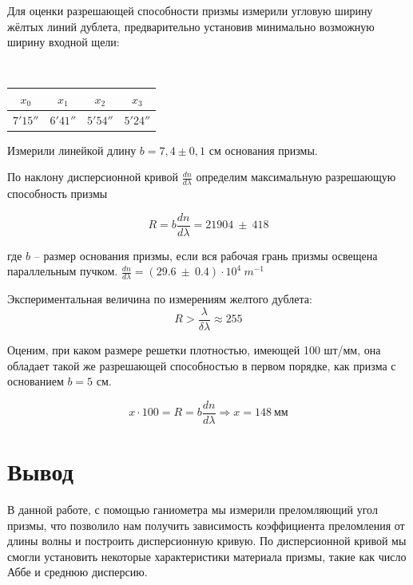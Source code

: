 	Для оценки разрешающей способности призмы измерили угловую ширину жёлтых линий дублета, предварительно установив минимально возможную ширину входной щели:
	\begin{center}
		\\
		\vspace{0.4cm}
		\begin{tabular}{|c|c|c|c|}
			\hline
			$x_0$ & $x_1$ & $x_2$ & $x_3$ \\ \hline
			$7'15''$  & $6'41''$ & $5'54''$ & $5'24''$ \\ \hline
		\end{tabular}
	\end{center}
	Измерили линейкой длину $b=7{,}4\pm0{,}1$ см основания призмы.
	
	По наклону дисперсионной кривой $\frac{d n}{d \lambda}$ определим максимальную разрешающую способность призмы
	
	\begin{equation}
		R = b \frac{d n}{d \lambda} = 21904 ~ \pm ~ 418
	\end{equation}
	
	где $b$ -- размер основания призмы, если вся рабочая грань призмы освещена параллельным пучком. $\frac{d n}{d \lambda} = (29.6 ~ \pm ~ 0.4) \cdot 10^4 ~ m^{-1}$
	
	Экспериментальная величина по измерениям желтого дублета:
	\[ R > \frac{\lambda}{\delta \lambda} \approx 255 \] 
	
	Оценим, при каком размере решетки плотностью, имеющей 100 шт/мм, она обладает такой же разрешающей способностью в первом порядке, как призма с основанием $b = 5$ см.
	
	\[ x \cdot 100 = R = b \frac{d n}{d \lambda} \Rightarrow x = 148 ~ \text{мм} \] 
	
	\section*{Вывод}
	
	В данной работе, с помощью ганиометра мы измерили преломляющий угол призмы, что позволило нам получить зависимость коэффициента преломления от длины волны и построить дисперсионную кривую. По дисперсионной кривой мы смогли установить некоторые характеристики материала призмы, такие как число Аббе и среднюю дисперсию.
	
